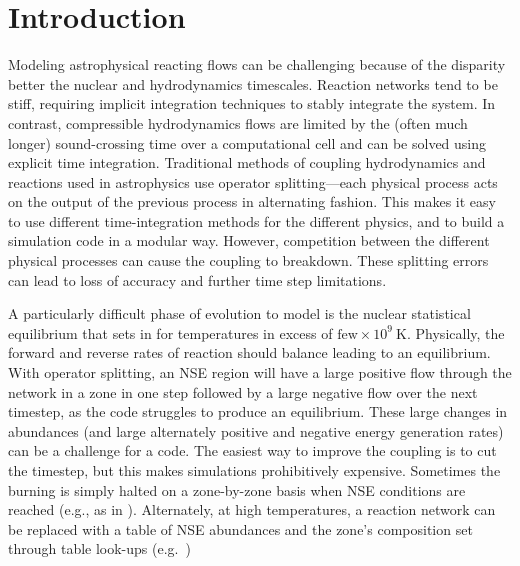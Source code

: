 \documentclass[times,modern]{aastex63}
\newcommand{\MarginPar}[1]{\marginpar{\vskip-\baselineskip\raggedright\tiny\sffamily\hrule\smallskip{\color{red}#1}\par\smallskip\hrule}}
\begin{document}

\section{Introduction}\label{Sec:Introduction}

Modeling astrophysical reacting flows can be challenging because of
the disparity better the nuclear and hydrodynamics timescales.
Reaction networks tend to be stiff, requiring implicit integration
techniques to stably integrate the system.  In contrast, compressible
hydrodynamics flows are limited by the (often much longer)
sound-crossing time over a computational cell and can be solved using
explicit time integration. Traditional methods of coupling
hydrodynamics and reactions used in astrophysics use operator
splitting---each physical process acts on the output of the previous
process in alternating fashion.  This makes it easy to use different
time-integration methods for the different physics, and to build a
simulation code in a modular way.  However, competition between the
different physical processes can cause the coupling to breakdown.
These splitting errors can lead to loss of accuracy and further time
step limitations.

A particularly difficult phase of evolution to model is the nuclear
statistical equilibrium that sets in for
temperatures in excess of $\mbox{few} \times 10^9~\mathrm{K}$.  Physically, the
forward and reverse rates of reaction should balance leading to an equilibrium.
With operator splitting, an NSE region will have a large positive flow
through the network in a zone in one step followed by a large negative
flow over the next timestep, as the code struggles to produce an
equilibrium.  These large changes in abundances (and large alternately
positive and negative energy generation rates) can be a challenge for
a code.  The easiest way to improve the coupling is to cut the
timestep, but this makes simulations prohibitively expensive.
Sometimes the burning is simply halted on a zone-by-zone basis when
NSE conditions are reached (e.g., as in \citealt{hedet}).
Alternately, at high temperatures, a reaction network can be replaced
with a table of NSE abundances and the zone's composition set through
table look-ups (e.g.\ \citealt{ma:2013}) \MarginPar{need more here}
\end{document}
